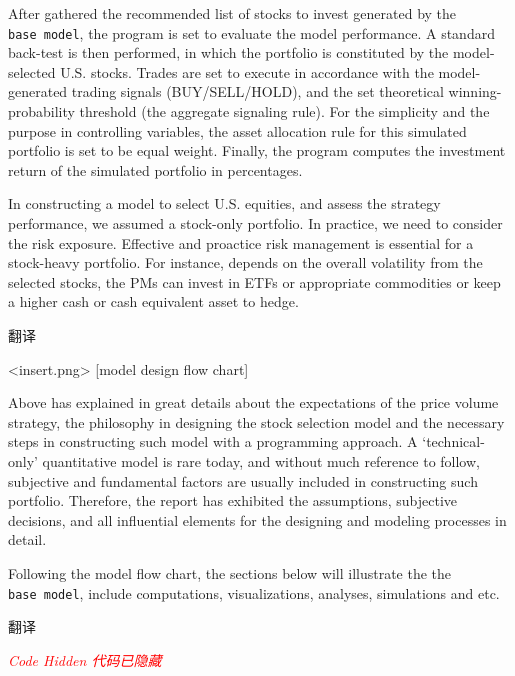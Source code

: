 \documentclass[
]{book}
\begin{document}
After gathered the recommended list of stocks to invest generated by the
\texttt{base\ model}, the program is set to evaluate the model
performance. A standard back-test is then performed, in which the
portfolio is constituted by the model-selected U.S. stocks. Trades are
set to execute in accordance with the model-generated trading signals
(BUY/SELL/HOLD), and the set theoretical winning-probability threshold
(the aggregate signaling rule). For the simplicity and the purpose in
controlling variables, the asset allocation rule for this simulated
portfolio is set to be equal weight. Finally, the program computes the
investment return of the simulated portfolio in percentages.

In constructing a model to select U.S. equities, and assess the strategy
performance, we assumed a stock-only portfolio. In practice, we need to
consider the risk exposure. Effective and proactice risk management is
essential for a stock-heavy portfolio. For instance, depends on the
overall volatility from the selected stocks, the PMs can invest in ETFs
or appropriate commodities or keep a higher cash or cash equivalent
asset to hedge.

翻译

\textless insert.png\textgreater{} {[}model design flow chart{]}

Above has explained in great details about the expectations of the price
volume strategy, the philosophy in designing the stock selection model
and the necessary steps in constructing such model with a programming
approach. A `technical-only' quantitative model is rare today, and
without much reference to follow, subjective and fundamental factors are
usually included in constructing such portfolio. Therefore, the report
has exhibited the assumptions, subjective decisions, and all influential
elements for the designing and modeling processes in detail.

Following the model flow chart, the sections below will illustrate the
the \texttt{base\ model}, include computations, visualizations,
analyses, simulations and etc.

翻译

\emph{\textcolor{red}{Code Hidden 代码已隐藏}}
\end{document}

